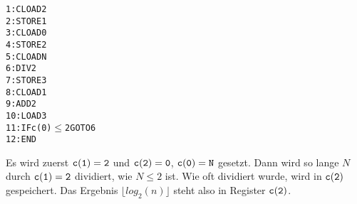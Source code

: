 \begin{alltt}
 1: CLOAD 2
 2: STORE 1
 3: CLOAD 0
 4: STORE 2
 5: CLOAD N
 6: DIV   2
 7: STORE 3
 8: CLOAD 1
 9: ADD   2
10: LOAD  3
11: IF c(0) \(\leq\) 2 GOTO 6
12: END 
\end{alltt}

Es wird zuerst $\tt{c(1)}=2$ und $\tt{c(2)}=0$, \(\tt{c(0)}=N\) gesetzt.
Dann wird so lange $N$ durch $\tt{c(1)}=2$ dividiert, wie $N \leq 2$ ist. Wie oft dividiert wurde, wird in $\tt{c(2)}$ gespeichert. Das Ergebnis $\lfloor log_2(n) \rfloor$ steht also in Register $\tt{c(2)}$.

